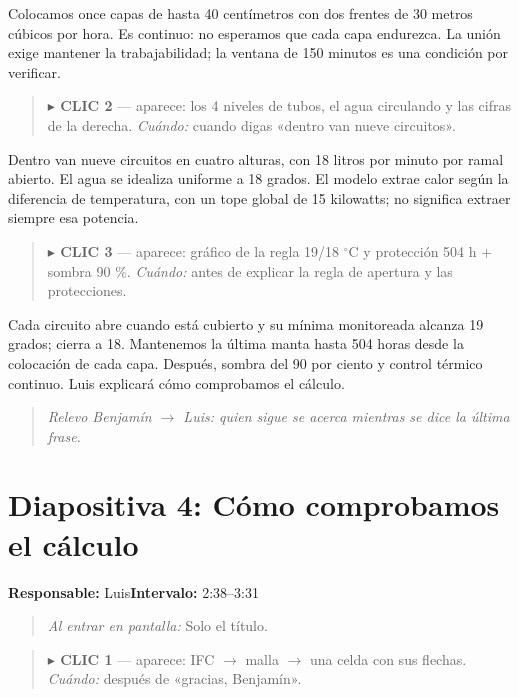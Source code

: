 \documentclass[11pt,a4paper]{article}
\newenvironment{indicacion}{\begin{quote}\small\color{grisindicacion}}{\end{quote}}
\newcommand{\lamina}[4]{%
  \section*{\color{petroleo}Diapositiva #1: #2}%
  \textbf{Responsable:} #3\hfill\textbf{Intervalo:} #4\par
}
\begin{document}
Colocamos once capas de hasta 40 centímetros con dos frentes de 30 metros cúbicos por hora. Es continuo: no esperamos que cada capa endurezca. La unión exige mantener la trabajabilidad; la ventana de 150 minutos es una condición por verificar.



\begin{indicacion}\textbf{\ensuremath{\blacktriangleright} CLIC 2} --- aparece: los 4 niveles de tubos, el agua circulando y las cifras de la derecha. \emph{Cuándo:} cuando digas «dentro van nueve circuitos».\end{indicacion}


Dentro van nueve circuitos en cuatro alturas, con 18 litros por minuto por ramal abierto. El agua se idealiza uniforme a 18 grados. El modelo extrae calor según la diferencia de temperatura, con un tope global de 15 kilowatts; no significa extraer siempre esa potencia.



\begin{indicacion}\textbf{\ensuremath{\blacktriangleright} CLIC 3} --- aparece: gráfico de la regla 19/18 \ensuremath{^\circ}C y protección 504 h + sombra 90 \%. \emph{Cuándo:} antes de explicar la regla de apertura y las protecciones.\end{indicacion}


Cada circuito abre cuando está cubierto y su mínima monitoreada alcanza 19 grados; cierra a 18. Mantenemos la última manta hasta 504 horas desde la colocación de cada capa. Después, sombra del 90 por ciento y control térmico continuo. Luis explicará cómo comprobamos el cálculo.



\begin{indicacion}\emph{Relevo Benjamín \ensuremath{\rightarrow} Luis: quien sigue se acerca mientras se dice la última frase.}\end{indicacion}

\clearpage

\lamina{4}{Cómo comprobamos el cálculo}{Luis}{2:38--3:31}

\begin{indicacion}\emph{Al entrar en pantalla:} Solo el título.\end{indicacion}

\begin{indicacion}\textbf{\ensuremath{\blacktriangleright} CLIC 1} --- aparece: IFC \ensuremath{\rightarrow} malla \ensuremath{\rightarrow} una celda con sus flechas. \emph{Cuándo:} después de «gracias, Benjamín».\end{indicacion}
\end{document}
